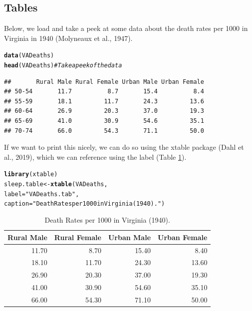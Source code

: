 \documentclass{article}\usepackage[]{graphicx}\usepackage[]{xcolor}
\makeatletter
\newcommand{\hlsng}[1]{\textcolor[rgb]{0.192,0.494,0.8}{#1}}%
\newcommand{\hlcom}[1]{\textcolor[rgb]{0.678,0.584,0.686}{\textit{#1}}}%
\newcommand{\hldef}[1]{\textcolor[rgb]{0.345,0.345,0.345}{#1}}%
\newcommand{\hlkwb}[1]{\textcolor[rgb]{0.69,0.353,0.396}{#1}}%
\newcommand{\hlkwc}[1]{\textcolor[rgb]{0.333,0.667,0.333}{#1}}%
\newcommand{\hlkwd}[1]{\textcolor[rgb]{0.737,0.353,0.396}{\textbf{#1}}}%
\newenvironment{kframe}{%
 \def\at@end@of@kframe{}%
 \ifinner\ifhmode%
  \def\at@end@of@kframe{\end{minipage}}%
  \begin{minipage}{\columnwidth}%
 \fi\fi%
 \def\FrameCommand##1{\hskip\@totalleftmargin \hskip-\fboxsep
 \colorbox{shadecolor}{##1}\hskip-\fboxsep
     \hskip-\linewidth \hskip-\@totalleftmargin \hskip\columnwidth}%
 \MakeFramed {\advance\hsize-\width
   \@totalleftmargin\z@ \linewidth\hsize
   \@setminipage}}%
 {\par\unskip\endMakeFramed%
 \at@end@of@kframe}
\newenvironment{knitrout}{}{} %
\makeatother
\begin{document}
\begin{multicols}{2}
\subsection{Tables}
Below, we load and take a peek at some data about the death rates per 1000 in Virginia in 1940 (Molyneaux et al., 1947).
\begin{knitrout}\scriptsize
{}\color{fgcolor}\begin{kframe}
\begin{alltt}
\hlkwd{data}\hldef{(VADeaths)}
\hlkwd{head}\hldef{(VADeaths)} \hlcom{# Take a peek of the data}
\end{alltt}
\begin{verbatim}
##       Rural Male Rural Female Urban Male Urban Female
## 50-54       11.7          8.7       15.4          8.4
## 55-59       18.1         11.7       24.3         13.6
## 60-64       26.9         20.3       37.0         19.3
## 65-69       41.0         30.9       54.6         35.1
## 70-74       66.0         54.3       71.1         50.0
\end{verbatim}
\end{kframe}
\end{knitrout}

If we want to print this nicely, we can do so using the xtable package (Dahl et al., 2019), which we can reference using the label (Table \ref{VADeaths.tab}).
\begin{knitrout}\scriptsize
{}\color{fgcolor}\begin{kframe}
\begin{alltt}
\hlkwd{library}\hldef{(xtable)}
\hldef{sleep.table}\hlkwb{<-}\hlkwd{xtable}\hldef{(VADeaths ,}
                    \hlkwc{label} \hldef{=} \hlsng{"VADeaths.tab"}\hldef{,}
                    \hlkwc{caption} \hldef{=} \hlsng{"Death Rates per 1000 in Virginia (1940)."}\hldef{)}
\end{alltt}
\end{kframe}
\end{knitrout}
\begin{table}[H]
\centering
\begingroup\small
\begin{tabular}{rrrr}
  \hline
Rural Male & Rural Female & Urban Male & Urban Female \\ 
  \hline
11.70 & 8.70 & 15.40 & 8.40 \\ 
  18.10 & 11.70 & 24.30 & 13.60 \\ 
  26.90 & 20.30 & 37.00 & 19.30 \\ 
  41.00 & 30.90 & 54.60 & 35.10 \\ 
  66.00 & 54.30 & 71.10 & 50.00 \\ 
   \hline
\end{tabular}
\endgroup
\caption{Death Rates per 1000 in Virginia (1940).} 
\label{VADeaths.tab}
\end{table}


\end{multicols}
\end{document}
